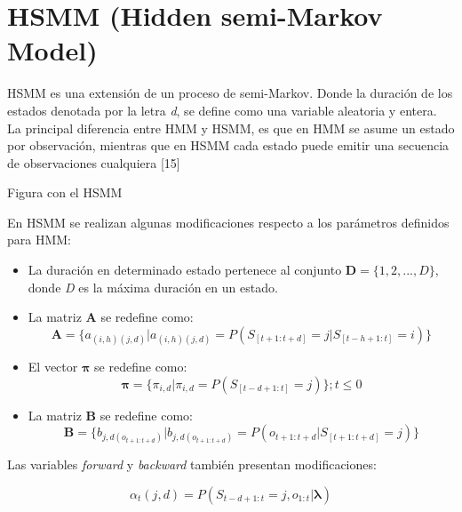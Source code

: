 \section*{HSMM (Hidden semi-Markov Model) }

HSMM es una extensi\'on de un proceso de semi-Markov. Donde la duraci\'on de los estados denotada por la letra \textit{d}, se define como una variable aleatoria y entera. 
\\La principal diferencia entre HMM y HSMM, es que en HMM se asume un estado por observaci\'on, mientras que en HSMM cada estado puede emitir una secuencia de observaciones cualquiera [15]

Figura con el HSMM

En HSMM se realizan algunas modificaciones respecto a los par\'ametros definidos para HMM:

\begin{itemize}
\item La duraci\'on en determinado estado pertenece al conjunto $\textbf{D} = \lbrace 1,2,...,D \rbrace$, donde \textit{D} es la m\'axima duraci\'on en un estado.

\item La matriz \textbf{A} se redefine como: 
\begin{equation}
\textbf{A} = \lbrace a_{(i,h)(j,d)} \vert a_{(i,h)(j,d)} = P(S_{[t+1:t+d]} = j \vert S_{[t-h+1:t]} = i) \rbrace
\end{equation}

\item El vector $\boldsymbol\pi$ se redefine como:
\begin{equation}
\boldsymbol\pi = \lbrace \pi_{i,d} \vert \pi_{i,d} = P(S_{[t-d+1:t]} = j) \rbrace ; t \leqslant 0
\end{equation}

\item La matriz \textbf{B} se redefine como:
\begin{equation}
\textbf{B} = \lbrace b_{j,d(o_{t+1:t+d})} \vert b_{j,d(o_{t+1:t+d})} = P(o_{t+1:t+d} \vert S_{[t+1:t+d]} = j) \rbrace
\end{equation}

\end{itemize}

Las variables \textit{forward} y \textit{backward} tambi\'en presentan modificaciones:

\begin{equation}
\alpha_{t}(j,d) = P(S_{t-d+1:t} = j, o_{1:t} \vert \boldsymbol\lambda)
\end{equation}

